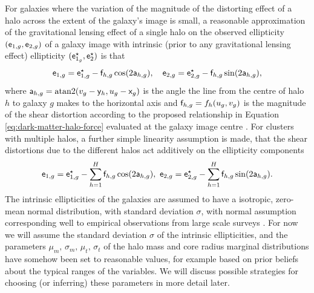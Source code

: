 For galaxies where the variation of the magnitude of the distorting effect of a halo across the extent of the galaxy's image is small, a reasonable approximation of the gravitational lensing effect of a single halo on the observed ellipticity $(\mathsf{e}_{1,g},\mathsf{e}_{2,g})$ of a galaxy image with intrinsic (prior to any gravitational lensing effect) ellipticity $(\mathsf{e}_{1_g}^\star, \mathsf{e}_2^\star)$ is that 
\begin{equation}\label{eq:obs-ellipticity-single-halo}
  \mathsf{e}_{1,g} = \mathsf{e}_{1,g}^\star - \mathsf{f}_{h,g} \cos(2 \mathsf{a}_{h,g}),
  \quad
  \mathsf{e}_{2,g} = \mathsf{e}_{2,g}^\star -  \mathsf{f}_{h,g} \sin(2 \mathsf{a}_{h,g}),
\end{equation}
where $\rvar{a}_{h,g} = \textrm{atan2}\lpa v_g - \rvar{y}_h, u_g - \rvar{x}_g\rpa$ is the angle the line from the centre of halo $h$ to galaxy $g$ makes to the horizontal axis and $\mathsf{f}_{h,g} = f_h(u_g, v_g)$ is the magnitude of the shear distortion according to the proposed relationship in Equation \eqref{eq:dark-matter-halo-force} evaluated at the galaxy image centre \citep{bartelmann2001weak,marshall2003bayesian}. For clusters with multiple halos, a further simple linearity assumption is made, that the shear distortions due to the different halos act additively on the ellipticity components
\begin{equation}\label{eq:obs-ellipticity-multiple-halos}
  \mathsf{e}_{1,g} = \mathsf{e}_{1,g}^\star - \sum_{h=1}^H \mathsf{f}_{h,g} \cos(2 \mathsf{a}_{h,g}),
  ~
  \mathsf{e}_{2,g} = \mathsf{e}_{2,g}^\star -  \sum_{h=1}^H \mathsf{f}_{h,g} \sin(2 \mathsf{a}_{h,g}).
\end{equation}
The intrinsic ellipticities of the galaxies are assumed to have a isotropic, zero-mean normal distribution,  with standard deviation $\sigma$, with normal assumption corresponding well to empirical observations from large scale surveys \citep{bartelmann2001weak,marshall2003bayesian}. For now we will assume the standard deviation $\sigma$ of the intrinsic ellipticities, and the parameters $\mu_m,\,\sigma_m,\,\mu_t,\,\sigma_t$ of the halo mass and core radius marginal distributions have somehow been set to reasonable values, for example based on prior beliefs about the typical ranges of the variables. We will discuss possible strategies for choosing (or inferring) these parameters in more detail later.


